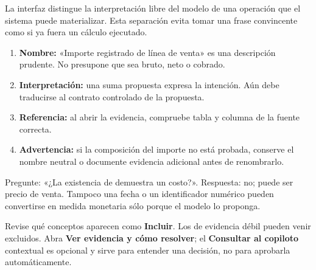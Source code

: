 La interfaz distingue la interpretación libre del modelo de una operación que el sistema puede materializar. Esta separación evita tomar una frase convincente como si ya fuera un cálculo ejecutado.
\begin{enumerate}
\item \textbf{Nombre:} «Importe registrado de línea de venta» es una descripción prudente. No presupone que sea bruto, neto o cobrado.
\item \textbf{Interpretación:} una suma propuesta expresa la intención. Aún debe traducirse al contrato controlado de la propuesta.
\item \textbf{Referencia:} al abrir la evidencia, compruebe tabla y columna de la fuente correcta.
\item \textbf{Advertencia:} si la composición del importe no está probada, conserve el nombre neutral o documente evidencia adicional antes de renombrarlo.
\end{enumerate}
\begin{good}
Pregunte: «¿La existencia de  demuestra un costo?». Respuesta: no; puede ser precio de venta. Tampoco una fecha o un identificador numérico pueden convertirse en medida monetaria sólo porque el modelo lo proponga.
\end{good}

Revise qué conceptos aparecen como \textbf{Incluir}. Los de evidencia débil pueden venir excluidos. Abra \textbf{Ver evidencia y cómo resolver}; el \textbf{Consultar al copiloto} contextual es opcional y sirve para entender una decisión, no para aprobarla automáticamente.


